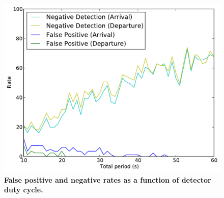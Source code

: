 \begin{figure}
\centering
\includegraphics[width=\columnwidth]{./figures/Rate_FP_and_ND.pdf}

\caption{\textbf{False positive and negative rates as a function of detector
duty cycle.}} 

\label{fig-falsepositives}
\end{figure}

